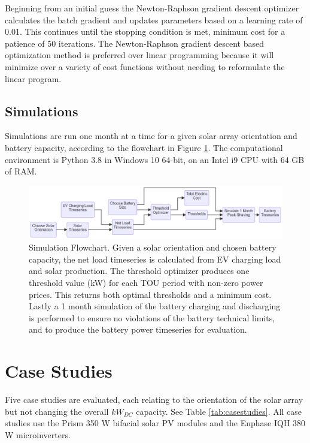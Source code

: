 \documentclass[journal,article,submit,pdftex,moreauthors]{Definitions/mdpi}
\begin{document}
Beginning from an initial guess the Newton-Raphson gradient descent
optimizer calculates the batch gradient and updates parameters based on
a learning rate of 0.01. This continues until the stopping condition is
met, minimum cost for a patience of 50 iterations. The Newton-Raphson
gradient descent based optimization method is preferred over linear
programming because it will minimize over a variety of cost functions
without needing to reformulate the linear program.

\subsection{Simulations}\label{simulations}%

Simulations are run one month at a time for a given solar array
orientation and battery capacity, according to the flowchart in Figure \ref{fig:simulation-flowchart}.
The computational environment is Python 3.8 in Windows 10 64-bit, on
an Intel i9 CPU with 64 GB of RAM.

\begin{figure}
  \centering
  \includegraphics[width=12cm]{./images/simulation flowchart.png}
  \caption{Simulation Flowchart. Given a solar orientation
  and chosen battery capacity, the net load timeseries is calculated from
  EV charging load and solar production. The threshold optimizer produces
  one threshold value (kW) for each TOU period with non-zero power prices.
  This returns both optimal thresholds and a minimum cost. Lastly a 1
  month simulation of the battery charging and discharging is performed to
  ensure no violations of the battery technical limits, and to produce the
  battery power timeseries for evaluation.}
  \label{fig:simulation-flowchart}
\end{figure}

\section{Case Studies}\label{case-studies}%

Five case studies are evaluated, each relating to the orientation of the
solar array but not changing the overall \(kW_{DC}\) capacity. See Table \ref{tab:casestudies}. All case
studies use the Prism 350 W bifacial solar PV modules and the Enphase
IQH 380 W microinverters.
\end{document}
